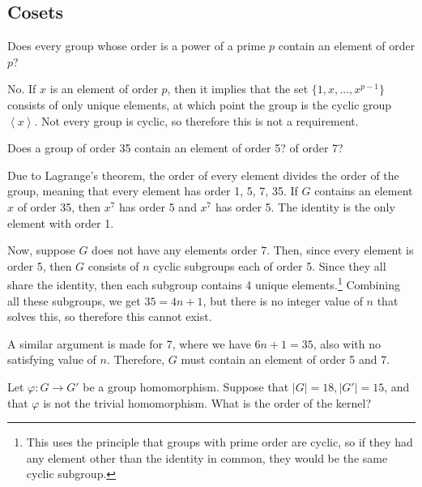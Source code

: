 \documentclass[10pt]{article}
\begin{document}
\subsection{Cosets}
\begin{problem}
	Does every group whose order is a power of a prime \( p \) contain 
	an element of order \( p \)? 
\end{problem}

\begin{solution}
	No. If \( x \) is an element of order \( p \), then it implies that 
	the set \( \{1, x, \dots, x^{p - 1}\}  \) consists of only unique 
	elements, at which point the group is the cyclic group \( \left< x \right> \). 
	Not every group is cyclic, so therefore this is not a requirement. 
\end{solution}

\begin{problem}
	Does a group of order 35 contain an element of order 5? of order 7?
\end{problem}

\begin{solution}
	Due to Lagrange's theorem, the order of every element divides the order of the 
	group, meaning that every element has order 1, 5, 7, 35. If \( G \) contains 
	an element \( x \) of order 35, then \( x^{7}  \) has order 5 and 
	\( x^{7} \) has order 5. The identity is the only element with order 1. 

	Now, suppose \( G \) does not have any elements order 7. Then, since every 
	element is order 5, then \( G \) consists of \( n \) cyclic subgroups 
	each of order 5. Since they all share the identity, then each subgroup contains 
	4 unique elements.\footnote{This uses the principle that groups with prime 
		order are cyclic, so if they had any element other than the identity in common,
	they would be the same cyclic subgroup.}
	Combining all these subgroups, we get \( 35 = 4n + 1 \), but 
	there is no integer value of \( n \) that solves this, so therefore 
	this cannot exist. 

	A similar argument is made for 7, where we have \( 6n + 1 = 35 \), also with 
	no satisfying value of \( n \). Therefore, \( G \) must contain 
	an element of order 5 and 7. 
\end{solution}

\begin{problem}
	Let \( \varphi: G \to G' \) be a group homomorphism. Suppose that 
	\( |G| = 18, |G'| = 15 \), and that \( \varphi \) is not the trivial homomorphism.
	What is the order of the kernel?
\end{problem}
\end{document}
